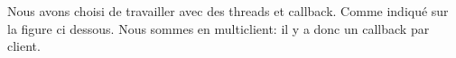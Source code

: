 \documentclass[11pt,dvipsnames,svgnames]{report}
\begin{document}
%
%
%
%
%
%

Nous avons choisi de travailler avec des threads et callback. Comme indiqué sur la figure ci dessous. Nous sommes en multiclient: il y a donc un callback par client.
\end{document}
